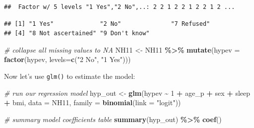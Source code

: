 \documentclass[
]{book}
\newenvironment{Shaded}{\begin{snugshade}}{\end{snugshade}}
\newcommand{\CommentTok}[1]{\textcolor[rgb]{0.56,0.35,0.01}{\textit{#1}}}
\newcommand{\DataTypeTok}[1]{\textcolor[rgb]{0.13,0.29,0.53}{#1}}
\newcommand{\DecValTok}[1]{\textcolor[rgb]{0.00,0.00,0.81}{#1}}
\newcommand{\KeywordTok}[1]{\textcolor[rgb]{0.13,0.29,0.53}{\textbf{#1}}}
\newcommand{\NormalTok}[1]{#1}
\newcommand{\OperatorTok}[1]{\textcolor[rgb]{0.81,0.36,0.00}{\textbf{#1}}}
\newcommand{\StringTok}[1]{\textcolor[rgb]{0.31,0.60,0.02}{#1}}
\begin{document}
\begin{Shaded}
\end{Shaded}

\begin{verbatim}
##  Factor w/ 5 levels "1 Yes","2 No",..: 2 2 1 2 2 1 2 2 1 2 ...
\end{verbatim}

\begin{Shaded}
\end{Shaded}

\begin{verbatim}
## [1] "1 Yes"             "2 No"              "7 Refused"        
## [4] "8 Not ascertained" "9 Don't know"
\end{verbatim}

\begin{Shaded}
\begin{Highlighting}[]
  \CommentTok{\# collapse all missing values to NA}
\NormalTok{  NH11 \textless{}{-}}\StringTok{ }\NormalTok{NH11 }\OperatorTok{\%\textgreater{}\%}
\StringTok{      }\KeywordTok{mutate}\NormalTok{(}\DataTypeTok{hypev =} \KeywordTok{factor}\NormalTok{(hypev, }\DataTypeTok{levels=}\KeywordTok{c}\NormalTok{(}\StringTok{"2 No"}\NormalTok{, }\StringTok{"1 Yes"}\NormalTok{)))}
\end{Highlighting}
\end{Shaded}

Now let's use \texttt{glm()} to estimate the model:

\begin{Shaded}
\begin{Highlighting}[]
  \CommentTok{\# run our regression model}
\NormalTok{  hyp\_out \textless{}{-}}\StringTok{ }\KeywordTok{glm}\NormalTok{(hypev }\OperatorTok{\textasciitilde{}}\StringTok{ }\DecValTok{1} \OperatorTok{+}\StringTok{ }\NormalTok{age\_p }\OperatorTok{+}\StringTok{ }\NormalTok{sex }\OperatorTok{+}\StringTok{ }\NormalTok{sleep }\OperatorTok{+}\StringTok{ }\NormalTok{bmi,}
                 \DataTypeTok{data =}\NormalTok{ NH11, }
                 \DataTypeTok{family =} \KeywordTok{binomial}\NormalTok{(}\DataTypeTok{link =} \StringTok{"logit"}\NormalTok{))}
  
  \CommentTok{\# summary model coefficients table}
  \KeywordTok{summary}\NormalTok{(hyp\_out) }\OperatorTok{\%\textgreater{}\%}\StringTok{ }\KeywordTok{coef}\NormalTok{()}
\end{Highlighting}
\end{Shaded}
\end{document}
